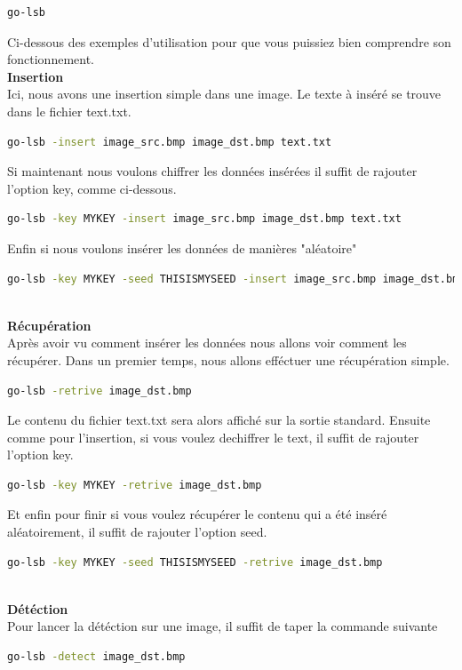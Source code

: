 \documentclass[letterpaper,12pt, french]{article}
\begin{document}
\begin{lstlisting}[language=bash]
go-lsb
\end{lstlisting}
\vspace{1\baselineskip}
\space
Ci-dessous des exemples d'utilisation pour que vous puissiez bien comprendre son fonctionnement.
\vspace{1\baselineskip}
\\
\textbf{Insertion}
\vspace{1\baselineskip}
\\
Ici, nous avons une insertion simple dans une image. Le texte à inséré se trouve dans le fichier text.txt.
\begin{lstlisting}[language=bash]
go-lsb -insert image_src.bmp image_dst.bmp text.txt
\end{lstlisting}
\vspace{1\baselineskip}
\space
Si maintenant nous voulons chiffrer les données insérées il suffit de rajouter l'option key, comme ci-dessous.
\begin{lstlisting}[language=bash]
go-lsb -key MYKEY -insert image_src.bmp image_dst.bmp text.txt
\end{lstlisting}
\vspace{1\baselineskip}
\space
Enfin si nous voulons insérer les données de manières "aléatoire"
\begin{lstlisting}[language=bash]
go-lsb -key MYKEY -seed THISISMYSEED -insert image_src.bmp image_dst.bmp text.txt
\end{lstlisting}
\vspace{1\baselineskip}
\\
\textbf{Récupération}
\vspace{1\baselineskip}
\\
Après avoir vu comment insérer les données nous allons voir comment les récupérer.
Dans un premier temps, nous allons efféctuer une récupération simple.
\begin{lstlisting}[language=bash]
go-lsb -retrive image_dst.bmp
\end{lstlisting}
\vspace{1\baselineskip}
\space
Le contenu du fichier text.txt sera alors affiché sur la sortie standard. 
Ensuite comme pour l'insertion, si vous voulez dechiffrer le text, il suffit de rajouter l'option key.
\begin{lstlisting}[language=bash]
go-lsb -key MYKEY -retrive image_dst.bmp
\end{lstlisting}
\vspace{1\baselineskip}
\space
Et enfin pour finir si vous voulez récupérer le contenu qui a été inséré aléatoirement, il suffit de rajouter l'option seed.
\begin{lstlisting}[language=bash]
go-lsb -key MYKEY -seed THISISMYSEED -retrive image_dst.bmp
\end{lstlisting}
\vspace{1\baselineskip}
\\
\textbf{Détéction}
\vspace{1\baselineskip}
\\
Pour lancer la détéction sur une image, il suffit de taper la commande suivante
\begin{lstlisting}[language=bash]
go-lsb -detect image_dst.bmp
\end{lstlisting}
\end{document}
